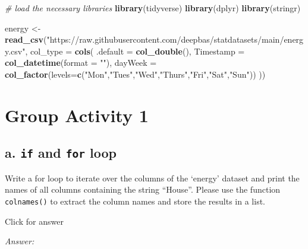 \documentclass[
]{book}
\newenvironment{Shaded}{\begin{snugshade}}{\end{snugshade}}
\newcommand{\AttributeTok}[1]{\textcolor[rgb]{0.13,0.29,0.53}{#1}}
\newcommand{\CommentTok}[1]{\textcolor[rgb]{0.56,0.35,0.01}{\textit{#1}}}
\newcommand{\FunctionTok}[1]{\textcolor[rgb]{0.13,0.29,0.53}{\textbf{#1}}}
\newcommand{\NormalTok}[1]{#1}
\newcommand{\OtherTok}[1]{\textcolor[rgb]{0.56,0.35,0.01}{#1}}
\newcommand{\StringTok}[1]{\textcolor[rgb]{0.31,0.60,0.02}{#1}}
\begin{document}
\begin{Shaded}
\begin{Highlighting}[]
\CommentTok{\# load the necessary libraries}
\FunctionTok{library}\NormalTok{(tidyverse)}
\FunctionTok{library}\NormalTok{(dplyr)}
\FunctionTok{library}\NormalTok{(stringr)}


\NormalTok{energy }\OtherTok{\textless{}{-}} \FunctionTok{read\_csv}\NormalTok{(}\StringTok{"https://raw.githubusercontent.com/deepbas/statdatasets/main/energy.csv"}\NormalTok{,}
                    \AttributeTok{col\_type =} \FunctionTok{cols}\NormalTok{(}
                     \AttributeTok{.default =} \FunctionTok{col\_double}\NormalTok{(), }
                      \AttributeTok{Timestamp =} \FunctionTok{col\_datetime}\NormalTok{(}\AttributeTok{format =} \StringTok{""}\NormalTok{),}
                      \AttributeTok{dayWeek =} \FunctionTok{col\_factor}\NormalTok{(}\AttributeTok{levels=}\FunctionTok{c}\NormalTok{(}\StringTok{"Mon"}\NormalTok{,}\StringTok{"Tues"}\NormalTok{,}\StringTok{"Wed"}\NormalTok{,}\StringTok{"Thurs"}\NormalTok{,}\StringTok{"Fri"}\NormalTok{,}\StringTok{"Sat"}\NormalTok{,}\StringTok{"Sun"}\NormalTok{))}
\NormalTok{                     ))}
\end{Highlighting}
\end{Shaded}

\hypertarget{group-activity-1-2}{%
\section{Group Activity 1}\label{group-activity-1-2}}

\hypertarget{a.-if-and-for-loop}{%
\subsection{\texorpdfstring{a. \texttt{if} and \texttt{for} loop}{a. if and for loop}}\label{a.-if-and-for-loop}}

Write a for loop to iterate over the columns of the `energy' dataset and print the names of all columns containing the string ``House''. Please use the function \texttt{colnames()} to extract the column names and store the results in a list.

Click for answer

\emph{Answer:}
\end{document}
